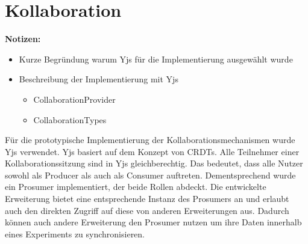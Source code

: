 \section{Kollaboration}\label{section:prototypische-implementierung:kollaboration}

\begin{note}
    \textbf{Notizen:}
    \begin{itemize}
        \item Kurze Begründung warum Yjs für die Implementierung ausgewählt wurde
        \item Beschreibung der Implementierung mit Yjs
              \begin{itemize}
                  \item CollaborationProvider
                  \item CollaborationTypes
              \end{itemize}
    \end{itemize}
\end{note}

Für die prototypische Implementierung der Kollaborationsmechanismen wurde Yjs \cite{noauthor_yjs_nodate} verwendet. Yjs basiert auf dem Konzept von \acp{CRDT}. Alle Teilnehmer einer Kollaborationssitzung sind in Yjs gleichberechtig. Das bedeutet, dass alle Nutzer sowohl als Producer als auch als Consumer auftreten. Dementsprechend wurde ein Prosumer implementiert, der beide Rollen abdeckt. Die entwickelte Erweiterung bietet eine entsprechende Instanz des Prosumers an und erlaubt auch den direkten Zugriff auf diese von anderen Erweiterungen aus. Dadurch können auch andere Erweiterung den Prosumer nutzen um ihre Daten innerhalb eines Experiments zu synchronisieren.